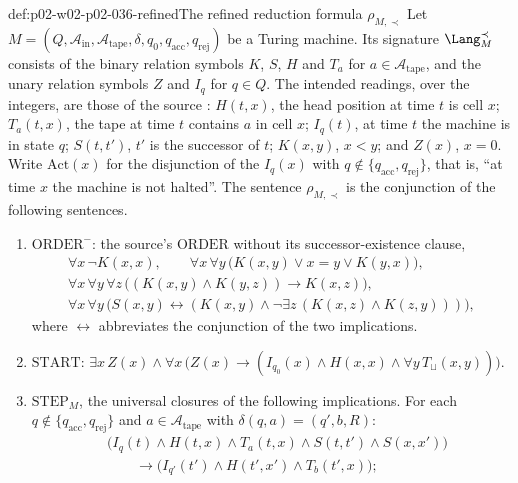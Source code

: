 \begin{hbdefinition}{def:p02-w02-p02-036-refined}{The refined reduction formula \(\rho_{M,\prec}\)}
Let \(M=(Q,\mathcal A_{\mathrm{in}},\mathcal A_{\mathrm{tape}},\delta,q_0,
q_{\mathrm{acc}},q_{\mathrm{rej}})\) be a Turing machine.  Its signature
\(\Lang_M^{\prec}\) consists of the binary relation symbols \(K\), \(S\),
\(H\) and \(T_a\) for \(a\in\mathcal A_{\mathrm{tape}}\), and the unary
relation symbols \(Z\) and \(I_q\) for \(q\in Q\).  The intended readings,
over the integers, are those of the source
\cite[Sect.~2.1.1, p.~20]{BorgerGradelGurevich1997}: \(H(t,x)\), the head
position at time \(t\) is cell \(x\); \(T_a(t,x)\), the tape at time \(t\)
contains \(a\) in cell \(x\); \(I_q(t)\), at time \(t\) the machine is in state
\(q\); \(S(t,t')\), \(t'\) is the successor of \(t\); \(K(x,y)\), \(x<y\); and
\(Z(x)\), \(x=0\).  Write \(\mathrm{Act}(x)\) for the disjunction of the
\(I_q(x)\) with \(q\notin\{q_{\mathrm{acc}},q_{\mathrm{rej}}\}\), that is,
``at time \(x\) the machine is not halted''.  The sentence
\(\rho_{M,\prec}\) is the conjunction of the following sentences.
\begin{enumerate}
\item \(\mathrm{ORDER}^{-}\): the source's \(\mathrm{ORDER}\) without its
  successor-existence clause,
  \[
  \begin{gathered}
   \forall x\,\neg K(x,x),\qquad
   \forall x\,\forall y\,\bigl(K(x,y)\lor x=y\lor K(y,x)\bigr),\\
   \forall x\,\forall y\,\forall z\,\bigl((K(x,y)\land K(y,z))\to K(x,z)\bigr),\\
   \forall x\,\forall y\,\bigl(S(x,y)\leftrightarrow(K(x,y)\land
   \neg\exists z\,(K(x,z)\land K(z,y)))\bigr),
  \end{gathered}
  \]
  where \(\leftrightarrow\) abbreviates the conjunction of the two
  implications.
\item \(\mathrm{START}\): \(\exists x\,Z(x)\land\forall x\,\bigl(Z(x)\to
  (I_{q_0}(x)\land H(x,x)\land\forall y\,T_{\sqcup}(x,y))\bigr)\).
\item \(\mathrm{STEP}_M\), the universal closures of the following
  implications.  For each \(q\notin\{q_{\mathrm{acc}},q_{\mathrm{rej}}\}\) and
  \(a\in\mathcal A_{\mathrm{tape}}\) with \(\delta(q,a)=(q',b,R)\):
  \[
  \begin{aligned}
   &\bigl(I_q(t)\land H(t,x)\land T_a(t,x)\land S(t,t')\land S(x,x')\bigr)\\
   &\qquad\to\bigl(I_{q'}(t')\land H(t',x')\land T_b(t',x)\bigr);
  \end{aligned}
\]
\end{enumerate}
\end{hbdefinition}
